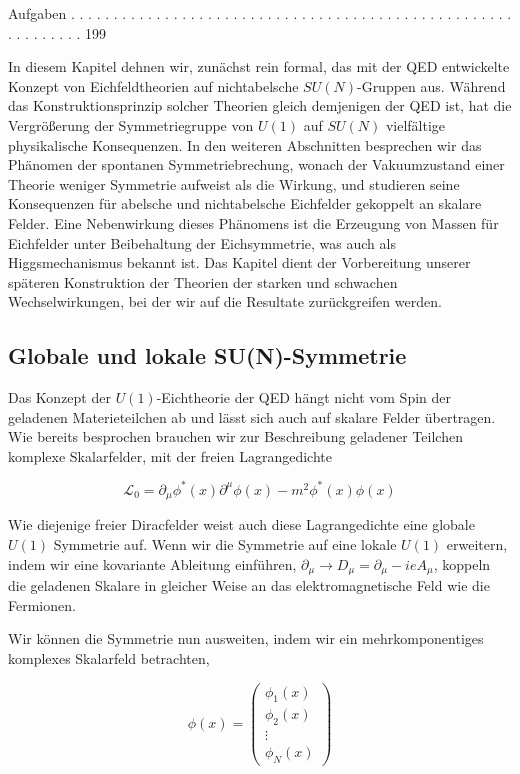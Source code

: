 \documentclass[10pt, letterpaper]{article}
\begin{document}
Aufgaben . . . . . . . . . . . . . . . . . . . . . . . . . . . . . . . . . . . . . . . . . . . . . . . . . . . . . . . . . . . . . 199

In diesem Kapitel dehnen wir, zunächst rein formal, das mit der QED entwickelte Konzept von Eichfeldtheorien auf nichtabelsche $S U(N)$-Gruppen aus. Während das Konstruktionsprinzip solcher Theorien gleich demjenigen der QED ist, hat die Vergrößerung der Symmetriegruppe von $U(1)$ auf $S U(N)$ vielfältige physikalische Konsequenzen. In den weiteren Abschnitten besprechen wir das Phänomen der spontanen Symmetriebrechung, wonach der Vakuumzustand einer Theorie weniger Symmetrie aufweist als die Wirkung, und studieren seine Konsequenzen für abelsche und nichtabelsche Eichfelder gekoppelt an skalare Felder. Eine Nebenwirkung dieses Phänomens ist die Erzeugung von Massen für Eichfelder unter Beibehaltung der Eichsymmetrie, was auch als Higgsmechanismus bekannt ist. Das Kapitel dient der Vorbereitung unserer späteren Konstruktion der Theorien der starken und schwachen Wechselwirkungen, bei der wir auf die Resultate zurückgreifen werden.

\subsection*{Globale und lokale SU(N)-Symmetrie}
Das Konzept der $U(1)$-Eichtheorie der QED hängt nicht vom Spin der geladenen Materieteilchen ab und lässt sich auch auf skalare Felder übertragen. Wie bereits besprochen brauchen wir zur Beschreibung geladener Teilchen komplexe Skalarfelder, mit der freien Lagrangedichte

$$
\mathscr{L}_{0}=\partial_{\mu} \phi^{*}(x) \partial^{\mu} \phi(x)-m^{2} \phi^{*}(x) \phi(x)
$$

Wie diejenige freier Diracfelder weist auch diese Lagrangedichte eine globale $U(1)$ Symmetrie auf. Wenn wir die Symmetrie auf eine lokale $U(1)$ erweitern, indem wir eine kovariante Ableitung einführen, $\partial_{\mu} \rightarrow D_{\mu}=\partial_{\mu}-i e A_{\mu}$, koppeln die geladenen Skalare in gleicher Weise an das elektromagnetische Feld wie die Fermionen.

Wir können die Symmetrie nun ausweiten, indem wir ein mehrkomponentiges komplexes Skalarfeld betrachten,

$$
\phi(x)=\left(\begin{array}{c}
\phi_{1}(x) \\
\phi_{2}(x) \\
\vdots \\
\phi_{N}(x)
\end{array}\right)
$$
\end{document}

